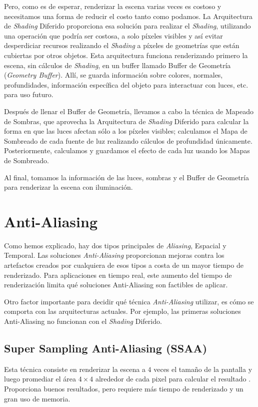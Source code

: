 \documentclass[pregrado]{tesis-usb} %
\begin{document}
Pero, como es de esperar, renderizar la escena varias veces es costoso y necesitamos una forma de reducir el costo tanto como podamos. La Arquitectura de \textit{Shading} Diferido proporciona esa solución para realizar el \textit{Shading}, utilizando una operación que podría ser costosa, a solo píxeles visibles y así evitar desperdiciar recursos realizando el \textit{Shading} a píxeles de geometrías que están cubiertas por otros objetos. Esta arquitectura funciona renderizando primero la escena, sin cálculos de \textit{Shading}, en un buffer llamado Buffer de Geometría (\textit{Geometry Buffer}). Allí, se guarda información sobre colores, normales, profundidades, información específica del objeto para interactuar con luces, etc. para uso futuro. 

Después de llenar el Buffer de Geometría, llevamos a cabo la técnica de Mapeado de Sombras, que aprovecha la Arquitectura de \textit{Shading} Diferido para calcular la forma en que las luces afectan sólo a los píxeles visibles; calculamos el Mapa de Sombreado de cada fuente de luz realizando cálculos de profundidad únicamente. Posteriormente, calculamos y guardamos el efecto de cada luz usando los Mapas de  Sombreado.

Al final, tomamos la información de las luces, sombras y el Buffer de Geometría para renderizar la escena con iluminación.


\section{Anti-Aliasing}
Como hemos explicado, hay dos tipos principales de \textit{Aliasing}, Espacial y Temporal. Las soluciones \textit{Anti-Aliasing} proporcionan mejoras contra los artefactos creados por cualquiera de esos tipos a costa de un mayor tiempo de renderizado. Para aplicaciones en tiempo real, este aumento del tiempo de renderización limita qué soluciones Anti-Aliasing son factibles de aplicar.

Otro factor importante para decidir qué técnica \textit{Anti-Aliasing} utilizar,  es cómo se comporta con las arquitecturas actuales. Por ejemplo, las primeras  soluciones Anti-Aliasing no funcionan con el \textit{Shading} Diferido.


\subsection{Super Sampling Anti-Aliasing (SSAA)}
Esta técnica consiste en renderizar la escena a $4$ veces el tamaño de la pantalla y luego promediar el área $4\times 4$ alrededor de cada pixel para calcular el resultado \cite{Doggett2017EDAN35}. Proporciona buenos resultados, pero requiere más tiempo de renderizado y un gran uso de memoria.
\end{document}
